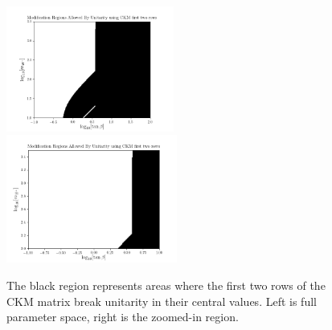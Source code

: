 \documentclass[11pt]{article}
\begin{document}
\begin{figure}[H]
    \centering
    \includegraphics[width=0.49\textwidth]{heatmaps/ckm_mod_full.png}
    \includegraphics[width=0.50\textwidth]{heatmaps/ckm_mod.png}
    \caption{The black region represents areas where the first two rows of the CKM matrix break unitarity in their central values. Left is full parameter space, right is the zoomed-in region.}
\end{figure}
\end{document}
